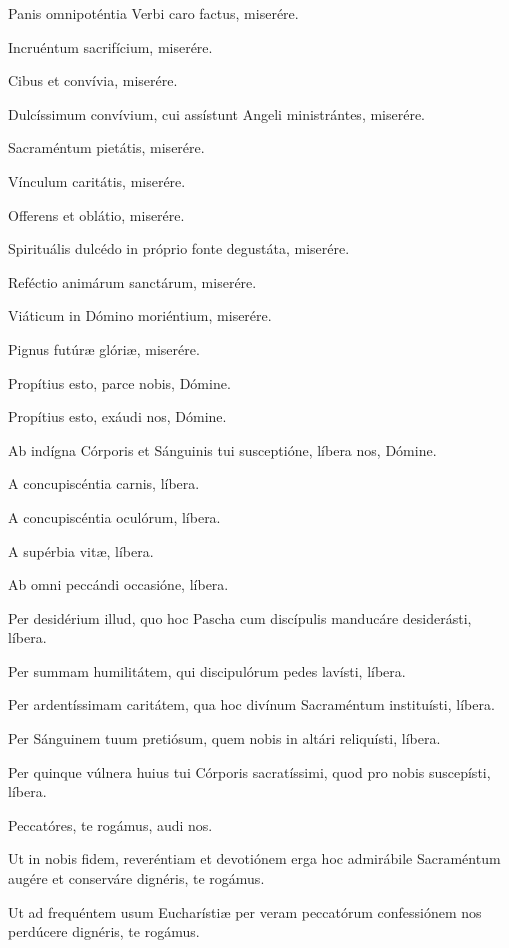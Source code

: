 \documentclass[12pt,a6paper]{book}
\begin{document}
\begin{sloppy}
Panis omnipoténtia Verbi caro factus, miserére.

Incruéntum sacrifícium, miserére.

Cibus et convívia, miserére.

Dulcíssimum convívium, cui assístunt Angeli ministrántes, miserére.

Sacraméntum pietátis, miserére.

Vínculum caritátis, miserére.

Offerens et oblátio, miserére.

Spirituális dulcédo in próprio fonte degustáta, miserére.

Reféctio animárum sanctárum, miserére.

Viáticum in Dómino moriéntium, miserére.

Pignus futúræ glóriæ, miserére.

\vspace{3mm}

Propítius esto, parce nobis, Dómine.

Propítius esto, exáudi nos, Dómine.

\vspace{3mm}

Ab indígna Córporis et Sánguinis tui susceptióne, líbera nos, Dómine.

A concupiscéntia carnis, líbera.

A concupiscéntia oculórum, líbera.

A supérbia vitæ, líbera.

Ab omni peccándi occasióne, líbera.

Per desidérium illud, quo hoc Pascha cum discípulis manducáre desiderásti, líbera.

Per summam humilitátem, qui discipulórum pedes lavísti, líbera.

Per ardentíssimam caritátem, qua hoc divínum Sacraméntum instituísti, líbera.

Per Sánguinem tuum pretiósum, quem nobis in altári reliquísti, líbera.

Per quinque vúlnera huius tui Córporis sacratíssimi, quod pro nobis suscepísti, líbera.

\vspace{3mm}

Peccatóres, te rogámus, audi nos.

Ut in nobis fidem, reveréntiam et devotiónem erga hoc admirábile Sacraméntum augére et conserváre dignéris, te rogámus.

Ut ad frequéntem usum Eucharístiæ per veram peccatórum confessiónem nos perdúcere dignéris, te rogámus.


\end{sloppy}
\end{document}

